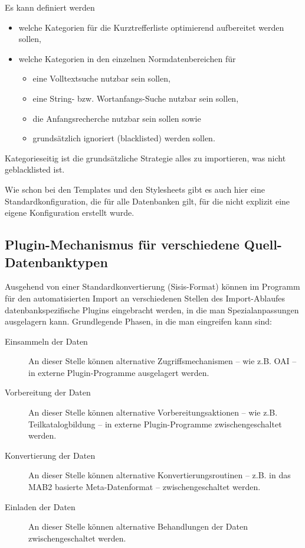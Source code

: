 \documentclass[11pt, twoside, a4paper, BCOR8mm, DIV12, bibtotoc,idxtotoc]{scrbook}
\begin{document}
Es kann definiert werden
\begin{itemize}
\item welche Kategorien für die Kurztrefferliste optimierend
  aufbereitet werden sollen,
\item welche Kategorien in den einzelnen Normdatenbereichen für
  \begin{itemize}
  \item eine Volltextsuche nutzbar sein sollen,
  \item eine String- bzw. Wortanfangs-Suche nutzbar sein sollen,
  \item die Anfangsrecherche nutzbar sein sollen sowie
  \item grundsätzlich ignoriert (blacklisted) werden sollen.
  \end{itemize}
\end{itemize}

Kategorieseitig ist die grundsätzliche Strategie alles zu
importieren, was nicht geblacklisted ist.

Wie schon bei den Templates und den Stylesheets gibt es auch hier
eine Standardkonfiguration, die für alle Datenbanken gilt, für die
nicht explizit eine eigene Konfiguration erstellt wurde.

\subsection{Plugin-Mechanismus für verschiedene Quell-Datenbanktypen}
Ausgehend von einer Standardkonvertierung (Sisis-Format) können im
Programm für den auto\-ma\-ti\-sier\-ten Import an verschiedenen Stellen des
Import-Ablaufes datenbankspezifische Plugins eingebracht werden, in die
man Spezialanpassungen ausgelagern kann. Grundlegende Phasen, in die
man eingreifen kann sind:
\begin{description}
\item[Einsammeln der Daten] An dieser Stelle können alternative
  Zugriffsmechanismen -- wie z.B. OAI --
  in externe Plugin-Programme ausgelagert werden.
\item[Vorbereitung der Daten] An dieser Stelle können alternative
  Vorbereitungsaktionen -- wie z.B. Teilkatalogbildung -- in externe
  Plugin-Programme zwischen\-ge\-schal\-tet werden.
\item[Konvertierung der Daten] An dieser Stelle können alternative
  Konvertierungsroutinen -- z.B. in das MAB2 basierte Meta-Datenformat
  -- zwischen\-ge\-schal\-tet werden.
\item[Einladen der Daten] An dieser Stelle können alternative
  Behandlungen der Daten zwischen\-ge\-schal\-tet werden.
\end{description}
\end{document}
